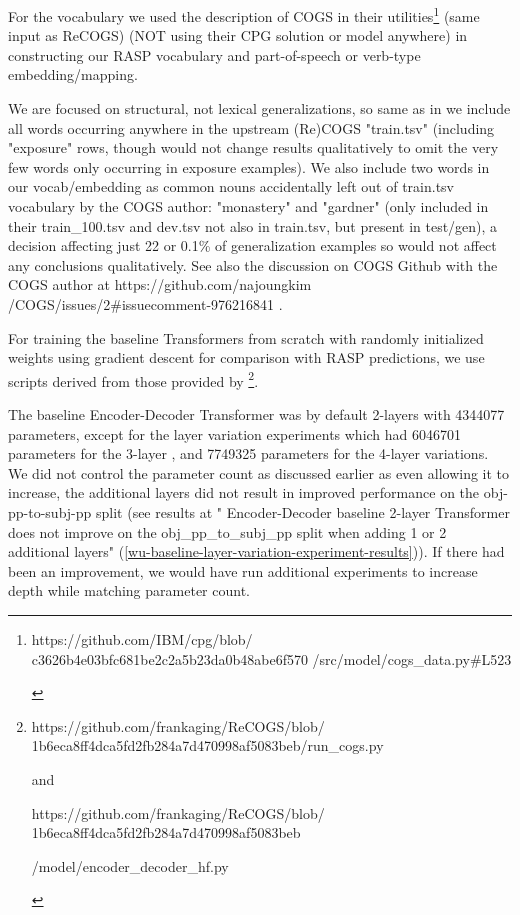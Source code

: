 \documentclass[11pt]{article}
\begin{document}
For the vocabulary we used the \cite{klinger2024compositionalprogramgenerationfewshot} description of COGS in their utilities\footnote{\begin{footnotesize}https://github.com/IBM/cpg/blob/
c3626b4e03bfc681be2c2a5b23da0b48abe6f570
/src/model/cogs\_data.py\#L523 
\end{footnotesize}
} (same input as ReCOGS) (NOT using their CPG solution or model anywhere) in constructing our RASP vocabulary and part-of-speech or verb-type embedding/mapping. 

We are focused on structural, not lexical generalizations, so same as in \cite{klinger2024compositionalprogramgenerationfewshot} we include all words occurring anywhere in the upstream (Re)COGS "train.tsv" (including "exposure" rows, though would not change results qualitatively to omit the very few words only occurring in exposure examples). We also include two words in our vocab/embedding as common nouns accidentally left out of train.tsv vocabulary by the COGS author: "monastery" and "gardner" (only included in their train\_100.tsv and dev.tsv not also in train.tsv, but present in test/gen), a decision affecting just 22 or 0.1\% of generalization examples so would not affect any conclusions qualitatively. See also the discussion on COGS Github with the COGS author at 
https://github.com/najoungkim
/COGS/issues/2\#issuecomment-976216841 .

For training the baseline Transformers from scratch with randomly initialized weights using gradient descent for comparison with RASP predictions, we use scripts derived from those provided by \cite{Wu2023}\footnote{\begin{footnotesize}https://github.com/frankaging/ReCOGS/blob/
1b6eca8ff4dca5fd2fb284a7d470998af5083beb/run\_cogs.py

and

https://github.com/frankaging/ReCOGS/blob/
1b6eca8ff4dca5fd2fb284a7d470998af5083beb

/model/encoder\_decoder\_hf.py 
\end{footnotesize}
}.

The baseline \cite{Wu2023} Encoder-Decoder Transformer was by default 2-layers with 4344077 parameters,
except for the layer variation experiments which had 6046701 parameters for the 3-layer , and 7749325 parameters for the 4-layer variations.
We did not control the parameter count as discussed earlier as even allowing it to increase, the additional layers did not result in improved performance on the obj-pp-to-subj-pp split (see results at "\cite{Wu2023} Encoder-Decoder baseline 2-layer Transformer does not improve on the obj\_pp\_to\_subj\_pp split when adding 1 or 2 additional layers" (\ref{wu-baseline-layer-variation-experiment-results})). If there had been an improvement, we would have run additional experiments to increase depth while matching parameter count.
\end{document}

